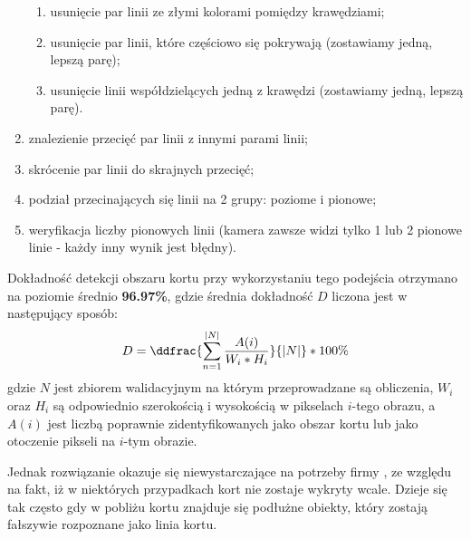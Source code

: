 \begin{enumerate}
\begin{enumerate}
          \item usunięcie par linii ze złymi kolorami pomiędzy krawędziami;
          \item usunięcie par linii, które częściowo się pokrywają (zostawiamy jedną, lepszą parę);
          \item usunięcie linii współdzielących jedną z krawędzi (zostawiamy jedną, lepszą parę).
        \end{enumerate}
  \item znalezienie przecięć par linii z innymi parami linii;
  \item skrócenie par linii do skrajnych przecięć;
  \item podział przecinających się linii na 2 grupy: poziome i pionowe;
  \item weryfikacja liczby pionowych linii (kamera zawsze widzi tylko 1 lub 2 pionowe linie - każdy inny wynik jest błędny).
\end{enumerate}

Dokładność detekcji obszaru kortu przy wykorzystaniu tego podejścia otrzymano na poziomie średnio \textbf{96.97\%}, gdzie średnia dokładność $D$ liczona jest w następujący sposób:
\vspace{-3pt} 
\[
\vspace{-3pt}
D = \ddfrac{\sum_{n = 1}^{|N|} \frac{A(i)}{W_{i} * H_{i}}}{|N|} * 100\%
\vspace{-3pt}
\]
gdzie $N$ jest zbiorem walidacyjnym na którym przeprowadzane są obliczenia, $W_{i}$ oraz $H_{i}$ są odpowiednio szerokością i wysokością w pikselach $i$-tego obrazu, a $A(i)$ jest liczbą poprawnie zidentyfikowanych jako obszar kortu lub jako otoczenie pikseli na $i$-tym obrazie.

Jednak rozwiązanie okazuje się niewystarczające na potrzeby firmy \blue{}, ze względu na fakt, iż w niektórych przypadkach kort nie zostaje wykryty wcale. Dzieje się tak często gdy w pobliżu kortu znajduje się podłużne obiekty, który zostają fałszywie rozpoznane jako linia kortu.

